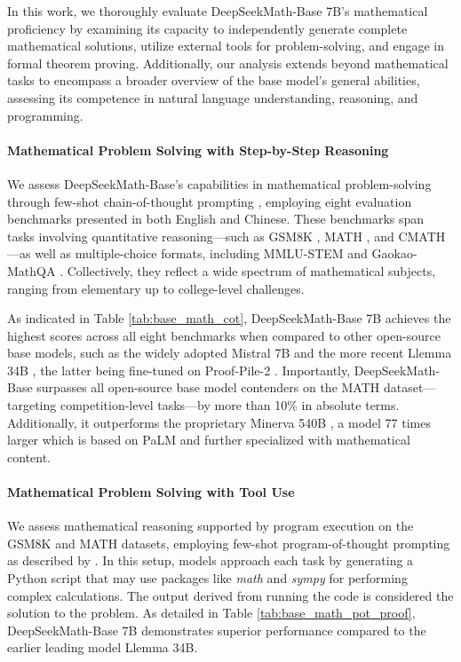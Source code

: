 \begin{itemize}[topsep=0pt]
In this work, we thoroughly evaluate DeepSeekMath-Base 7B's mathematical proficiency by examining its capacity to independently generate complete mathematical solutions, utilize external tools for problem-solving, and engage in formal theorem proving. Additionally, our analysis extends beyond mathematical tasks to encompass a broader overview of the base model's general abilities, assessing its competence in natural language understanding, reasoning, and programming.

\paragraph{Mathematical Problem Solving with Step-by-Step Reasoning}

We assess DeepSeekMath-Base’s capabilities in mathematical problem-solving through few-shot chain-of-thought prompting \citep{cot}, employing eight evaluation benchmarks presented in both English and Chinese. These benchmarks span tasks involving quantitative reasoning—such as GSM8K \citep{gsm8k}, MATH \citep{MATH}, and CMATH \citep{wei2023cmath}—as well as multiple-choice formats, including MMLU-STEM \citep{mmlu} and Gaokao-MathQA \citep{agieval}. Collectively, they reflect a wide spectrum of mathematical subjects, ranging from elementary up to college-level challenges.

As indicated in Table \ref{tab:base_math_cot}, DeepSeekMath-Base 7B achieves the highest scores across all eight benchmarks when compared to other open-source base models, such as the widely adopted Mistral 7B \citep{mistral} and the more recent Llemma 34B \citep{llemma}, the latter being fine-tuned on Proof-Pile-2 \citep{llemma}. Importantly, DeepSeekMath-Base surpasses all open-source base model contenders on the MATH dataset—targeting competition-level tasks—by more than 10\% in absolute terms. Additionally, it outperforms the proprietary Minerva 540B \citep{minerva}, a model 77 times larger which is based on PaLM \citep{palm} and further specialized with mathematical content.

\paragraph{Mathematical Problem Solving with Tool Use} We assess mathematical reasoning supported by program execution on the GSM8K and MATH datasets, employing few-shot program-of-thought prompting as described by \citet{pot,pal}. In this setup, models approach each task by generating a Python script that may use packages like \textit{math} and \textit{sympy} for performing complex calculations. The output derived from running the code is considered the solution to the problem. As detailed in Table \ref{tab:base_math_pot_proof}, DeepSeekMath-Base 7B demonstrates superior performance compared to the earlier leading model Llemma 34B.


\end{itemize}
